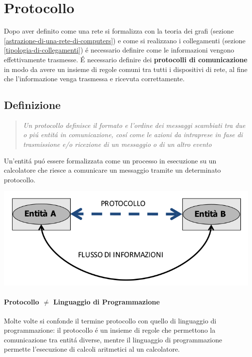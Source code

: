 \documentclass[12pt]{article}
\begin{document}
\section{Protocollo}\label{protocollo}
Dopo aver definito come una rete si formalizza con la teoria dei grafi (sezione \ref{astrazione-di-una-rete-di-computers}) e
come si realizzano i collegamenti (sezione \ref{tipologia-di-collegamenti}) \'e necessario definire come le informazioni
vengono effettivamente trasmesse. \'E necessario definire dei \textbf{protocolli di comunicazione} in modo da avere un insieme 
di regole comuni tra tutti i dispositivi di rete, al fine che l'informazione venga trasmessa e ricevuta correttamente.

\subsection{Definizione}\label{definizione}
\begin{quote}
    \textit{Un protocollo definisce il formato e l'ordine dei messaggi scambiati tra due o pi\'u	entit\'a in comunicazione, 
    cos\'i come le azioni da intraprese in fase di trasmissione e/o ricezione di un messaggio o di un altro evento}
\end{quote}
Un'entit\'a pu\'o essere formalizzata come un processo in esecuzione su un calcolatore che riesce a comunicare un messaggio 
tramite un determinato protocollo.
\begin{center}
	\includegraphics[scale=0.4]{introduzione-img10.png}
\end{center}
\paragraph{Protocollo $\neq$ Linguaggio di Programmazione} Molte volte si confonde il termine protocollo con quello di 
linguaggio di programmazione: il protocollo \'e un insieme di regole che permettono la comunicazione tra entit\'a diverse, 
mentre il linguaggio di programmazione permette l'esecuzione di calcoli aritmetici al un calcolatore. 
\end{document}
